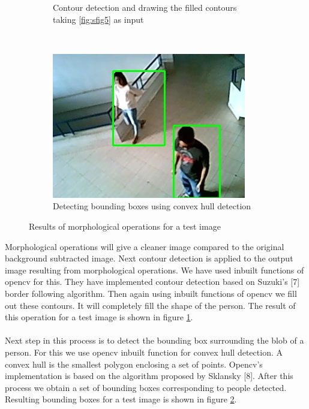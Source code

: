 \documentclass[12pt,a4paper]{report}
\begin{document}
\begin{figure}
\begin{subfigure}{.5\textwidth}
  \caption{Contour detection and drawing the filled contours taking \ref{fig:sfig5} as input}
  \label{fig:sfig6}
\end{subfigure}\\
\centering
\begin{subfigure}{.8\textwidth}
  \centering
  \includegraphics[width=.5\linewidth]{morphology/detections.jpeg}
  \caption{Detecting bounding boxes using convex hull detection}
  \label{fig:sfig7}
\end{subfigure}
\caption{Results of morphological operations for a test image}
\label{fig:fig}
\end{figure}

Morphological operations will give a cleaner image compared to the original background subtracted image. Next contour detection is applied to the output image resulting from morphological operations. We have used inbuilt functions of opencv for this. They have implemented contour detection based on Suzuki’s [7] border following algorithm. Then again using inbuilt functions of opencv we fill out these contours. It will completely fill the shape of the person. The result of this operation for a test image is shown in figure \ref{fig:sfig6}.
\\\\
Next step in this process is to detect the bounding box surrounding the blob of a person. For this we use opencv inbuilt function for convex hull detection. A convex hull is the smallest polygon enclosing a set of points. Opencv’s implementation is based on the algorithm proposed by Sklansky [8]. After this process we obtain a set of bounding boxes corresponding to people detected. Resulting bounding boxes for a test image is shown in figure \ref{fig:sfig7}.
\end{document}
